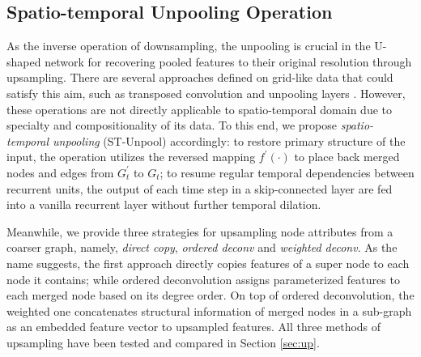 \documentclass[sigconf,screen]{acmart}
\begin{document}
\subsection{\label{sec:un}Spatio-temporal Unpooling Operation}
As the inverse operation of downsampling, the unpooling is crucial in the U-shaped network for recovering pooled features to their original resolution through upsampling. There are several approaches defined on grid-like data that could satisfy this aim, such as transposed convolution \cite{zeiler2011adaptive} and unpooling layers \cite{zeiler2014visualizing}. However, these operations are not directly applicable to spatio-temporal domain due to specialty and compositionality of its data. To this end, we propose \emph{spatio-temporal unpooling} (ST-Unpool) accordingly: to restore primary structure of the input, the operation utilizes the reversed mapping $f^{\prime}(\cdot)$ to place back merged nodes and edges from $G^{\prime}_t$ to $G_t$; to resume regular temporal dependencies between recurrent units, the output of each time step in a skip-connected layer are fed into a vanilla recurrent layer without further temporal dilation.

Meanwhile, we provide three strategies for upsampling node attributes from a coarser graph, namely, \emph{direct copy}, \emph{ordered deconv} and \emph{weighted deconv}. As the name suggests, the first approach directly copies features of a super node to each node it contains; while ordered deconvolution assigns parameterized features to each merged node based on its degree order. On top of ordered deconvolution, the weighted one concatenates structural information of merged nodes in a sub-graph as an embedded feature vector to upsampled features. All three methods of upsampling have been tested and compared in Section \ref{sec:up}.
\end{document}

